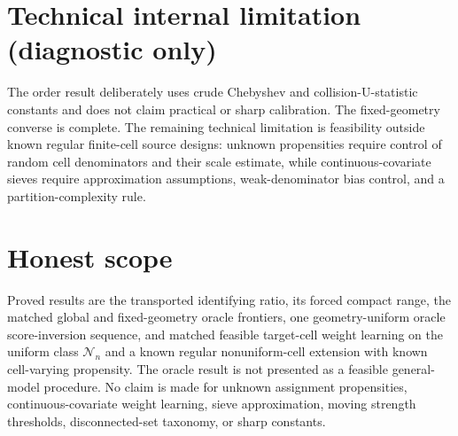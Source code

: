 \documentclass{article}
\begin{document}
\section*{Technical internal limitation (diagnostic only)}

The order result deliberately uses crude Chebyshev and collision-U-statistic constants and does not claim practical or sharp calibration.  The fixed-geometry converse is complete.  The remaining technical limitation is feasibility outside known regular finite-cell source designs: unknown propensities require control of random cell denominators and their scale estimate, while continuous-covariate sieves require approximation assumptions, weak-denominator bias control, and a partition-complexity rule.

\section{Honest scope}

Proved results are the transported identifying ratio, its forced compact range, the matched global and fixed-geometry oracle frontiers, one geometry-uniform oracle score-inversion sequence, and matched feasible target-cell weight learning on the uniform class \(\mathcal N_n\) and a known regular nonuniform-cell extension with known cell-varying propensity.  The oracle result is not presented as a feasible general-model procedure.  No claim is made for unknown assignment propensities, continuous-covariate weight learning, sieve approximation, moving strength thresholds, disconnected-set taxonomy, or sharp constants.
\end{document}
